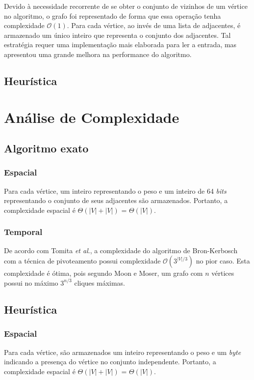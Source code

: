 \documentclass{article}
\begin{document}
Devido à necessidade recorrente de se obter o conjunto de vizinhos de um vértice no algoritmo, o grafo foi representado de forma que essa operação tenha complexidade $\mathcal{O}(1)$. Para cada vértice, ao invés de uma lista de adjacentes, é armazenado um único inteiro que representa o conjunto dos adjacentes. Tal estratégia requer uma implementação mais elaborada para ler a entrada, mas apresentou uma grande melhora na performance do algoritmo.


\pagebreak


\subsection{Heurística}

\section{Análise de Complexidade}

\subsection{Algoritmo exato}
\subsubsection{Espacial}
Para cada vértice, um inteiro representando o peso e um inteiro de 64 \textit{bits} representando o conjunto de seus adjacentes são armazenados. Portanto, a complexidade espacial é $\Theta(|V| + |V|)$ = $\Theta(|V|)$.
\subsubsection{Temporal}
De acordo com Tomita \textit{et al}.\cite{TOMITA200628}, a complexidade do algoritmo de Bron-Kerbosch com a técnica de \mbox{pivoteamento} possui complexidade $\mathcal{O}(3^{|V|/3})$ no pior caso. Esta complexidade é ótima, pois segundo Moon e Moser\cite{Moon1965}, um grafo com $n$ vértices possui no máximo $3^{n/3}$ cliques máximas.

\subsection{Heurística}
\subsubsection{Espacial}
Para cada vértice, são armazenados um inteiro representando o peso e um \textit{byte} indicando a presença do vértice no conjunto independente. Portanto, a complexidade espacial é $\Theta(|V| + |V|)$ = $\Theta(|V|)$.
\end{document}
